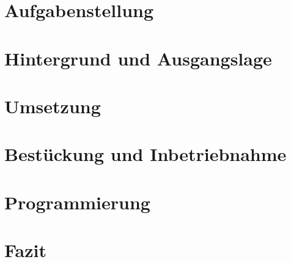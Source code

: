 \documentclass[fontsize=11pt,
		 oneside,
		 ngerman,
		 titlepage,
		 paper=a4,
		 bibliography=totoc,
		 listof=totoc,
		 DIV=10,
		 BCOR=5mm,
		 headsepline,
		 footsepline,
		 ]{scrartcl}
\begin{document}

\cleardoublepage
%

%



\tableofcontents
\clearpage

\section{Aufgabenstellung}
\label{sec: Aufgabenstellung}


\clearpage

\section{Hintergrund und Ausgangslage}
\label{sec:Hintergrund und Ausgangslage}




\clearpage

\section{Umsetzung}
\label{sec:Umsetzung}


\clearpage


\section{Bestückung und Inbetriebnahme}
\label{sec:BestueckungInbetriebnahme}

\clearpage

\section{Programmierung}
\label{sec:Programmierung}

\clearpage

\section{Fazit}
\label{fazit}

\clearpage
% 

% 

% 
% 
%
%
\end{document}
